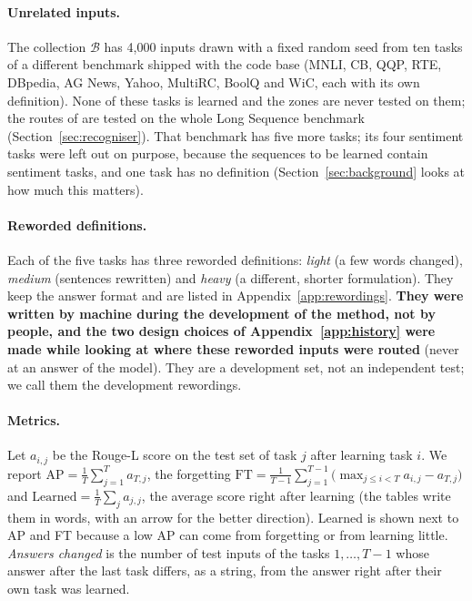 \paragraph{Unrelated inputs.} The collection $\mathcal{B}$ has 4{,}000 inputs drawn with a
fixed random seed from ten tasks of a different benchmark shipped with the code base (MNLI, CB,
QQP, RTE, DBpedia, AG News, Yahoo, MultiRC, BoolQ and WiC, each with its own definition). None of
these tasks is learned and the zones are never tested on them; the routes of \recog{} are tested
on the whole Long Sequence benchmark (Section~\ref{sec:recogniser}). That benchmark has five more tasks;
its four sentiment tasks were left out on purpose, because the sequences to be learned contain
sentiment tasks, and one task has no definition (Section~\ref{sec:background} looks at how much this
matters).

\paragraph{Reworded definitions.} Each of the five tasks has three reworded definitions: \emph{light}
(a few words changed), \emph{medium} (sentences rewritten) and \emph{heavy} (a different, shorter
formulation). They keep the answer format and are listed in Appendix~\ref{app:rewordings}.
\textbf{They were written by machine during the development of the method, not by people, and the two
design choices of Appendix~\ref{app:history} were made while looking at where these reworded inputs
were routed} (never at an answer of the model). They are a development set, not an independent test;
we call them the development rewordings.

\paragraph{Metrics.} Let $a_{i,j}$ be the Rouge-L score \citep{lin2004rouge} on the test set of task
$j$ after learning task $i$. We report $\mathrm{AP} = \tfrac{1}{T}\sum_{j=1}^{T} a_{T,j}$, the forgetting
$\mathrm{FT} = \tfrac{1}{T-1}\sum_{j=1}^{T-1}\bigl(\max_{j \le i < T} a_{i,j} - a_{T,j}\bigr)$ and
$\mathrm{Learned} = \tfrac{1}{T}\sum_{j} a_{j,j}$, the average score right after learning (the tables
write them in words, with an arrow for the better direction). Learned is shown next to AP and FT
because a low AP can come from forgetting or from learning little. \emph{Answers changed} is the
number of test inputs of the tasks $1, \dots, T-1$ whose answer after the last task differs, as a
string, from the answer right after their own task was learned.

